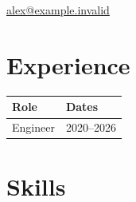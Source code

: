 \documentclass{resume}
\begin{document}
\section*{\candidate}
\href{mailto:alex@example.invalid}{alex@example.invalid}
\section*{Experience}
\begin{tabular}{ll}\toprule Role & Dates\\\midrule Engineer & 2020--2026\\\bottomrule\end{tabular}
\section*{Skills}
\end{document}
